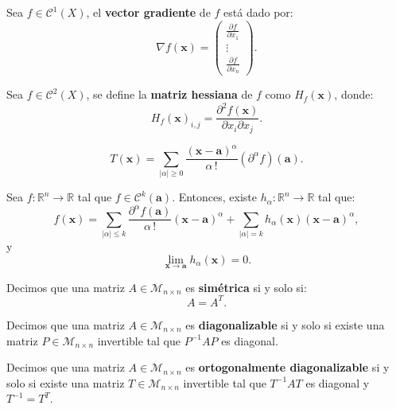 \documentclass[8pt,a4paper]{extarticle}
\begin{document}
\begin{multicols}{3}
	\begin{boxdef}
		Sea $f \in \mathcal{C}^1 (X)$, el \textbf{vector gradiente} de $f$ está dado por:
		\[
			\nabla f(\mathbf{x}) =
			\begin{pmatrix} \displaystyle \frac{\partial f}{\partial x_1} \\ \vdots \\ \displaystyle \frac{\partial f}{\partial x_n} \end{pmatrix}
			.\]
	\end{boxdef}

	\begin{boxdef}
		Sea $f \in \mathcal{C}^2 (X)$, se define la \textbf{matriz hessiana} de $f$ como $H_f(\mathbf{x})$, donde:
		\[
			H_f (\mathbf{x})_{i,j} = \frac{\partial^2 f(\mathbf{x})}{\partial x_i \partial x_j}
			.\]
	\end{boxdef}

	\begin{boxdef}
		\[
			T(\mathbf{x}) = \sum_{|\alpha| \ge 0} \frac{(\mathbf{x} - \mathbf{a})^\alpha}{\alpha\,!} \left(\partial^\alpha f \right)(\mathbf{a})
			.\]
	\end{boxdef}

	\begin{boxtheo}[de Taylor]
		Sea $f : \mathbb{R}^n \to \mathbb{R}$ tal que $f \in \mathcal{C}^k(\mathbf{a})$. Entonces, existe $h_{\alpha} : \mathbb{R}^n \to \mathbb{R}$ tal que:
		\[
			f(\mathbf{x}) = \sum_{|\alpha| \le k} \frac{\partial^\alpha f(\mathbf{a})}{\alpha\,!} (\mathbf{x} - \mathbf{a})^\alpha + \sum_{|\alpha| = k} h_{\alpha}(\mathbf{x})(\mathbf{x} - \mathbf{a})^\alpha
			,\]
		y
		\[
			\lim_{\mathbf{x} \to \mathbf{a}} h_{\alpha} (\mathbf{x}) = 0
			.\]
	\end{boxtheo}

	\begin{boxdef}
		Decimos que una matriz $A \in \mathcal{M}_{n \times n}$ es \textbf{simétrica} si y solo si:
		\[
			A = A^T
			.\]
	\end{boxdef}

	\begin{boxdef}
		Decimos que una matriz $A \in \mathcal{M}_{n \times n}$ es \textbf{diagonalizable} si y solo si existe una matriz $P  \in \mathcal{M}_{n \times n}$ invertible tal que $P^{-1}AP$ es diagonal.
	\end{boxdef}

	\begin{boxdef}
		Decimos que una matriz $A \in \mathcal{M}_{n \times n}$ es \textbf{ortogonalmente diagonalizable} si y solo si existe una matriz $T  \in \mathcal{M}_{n \times n}$ invertible tal que $T^{-1}AT$ es diagonal y $T^{-1} = T^T$.
	\end{boxdef}


\end{multicols}
\end{document}
